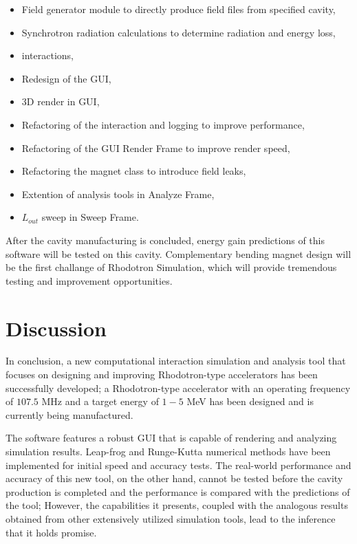 \documentclass[a4paper,oneside,12pt]{report}
\numberwithin{equation}{chapter}
\begin{document}
{\begin{itemize}
    \item Field generator module to directly produce field files from specified cavity,
    \item Synchrotron radiation calculations to determine radiation and energy loss,
    \item \ee interactions,
    \item Redesign of the GUI,
    \item 3D render in GUI,
    \item Refactoring of the \eEM interaction and logging to improve performance,
    \item Refactoring of the GUI Render Frame to improve render speed,
    \item Refactoring the magnet class to introduce field leaks,
    \item Extention of analysis tools in Analyze Frame,
    \item $L_{out}$ sweep in Sweep Frame.
\end{itemize} 


After the cavity manufacturing is concluded, energy gain predictions of this software will be tested on this cavity. 
Complementary bending magnet design will be the first challange of Rhodotron Simulation, which will provide tremendous testing and improvement opportunities.

\section{Discussion}
In conclusion, a new computational \eEM interaction simulation and analysis tool that focuses on designing and improving Rhodotron-type accelerators has been successfully developed; 
a Rhodotron-type accelerator with an operating frequency of $107.5$ MHz and a target energy of $1-5$ MeV has been designed and is currently being manufactured.

The software features a robust GUI that is capable of rendering and analyzing simulation results.
Leap-frog and Runge-Kutta numerical methods have been implemented for initial speed and accuracy tests.
The real-world performance and accuracy of this new tool, on the other hand, cannot be tested
before the cavity production is completed and the performance is compared with the predictions of the tool;
However, the capabilities it presents, coupled with the analogous results obtained from other extensively utilized simulation tools, 
lead to the inference that it holds promise.

\newpage

}
\end{document}
